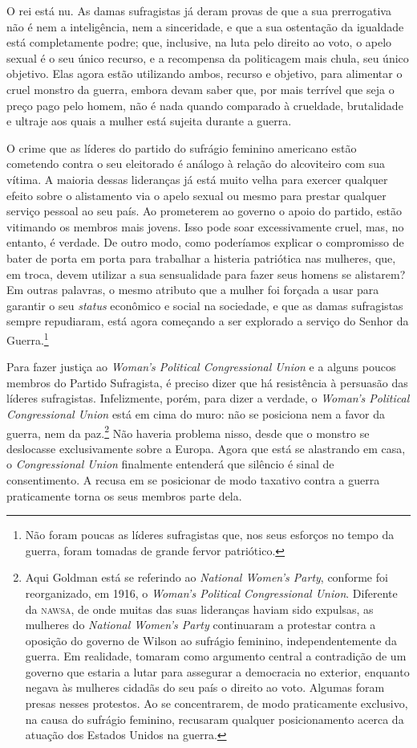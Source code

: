 O rei está nu. As damas sufragistas já deram provas de que a sua
prerrogativa não é nem a inteligência, nem a sinceridade, e que a sua
ostentação da igualdade está completamente podre; que, inclusive, na
luta pelo direito ao voto, o apelo sexual é o seu único recurso, e a
recompensa da politicagem mais chula, seu único objetivo. Elas agora
estão utilizando ambos, recurso e objetivo, para alimentar o cruel
monstro da guerra, embora devam saber que, por mais terrível que seja o
preço pago pelo homem, não é nada quando comparado à crueldade,
brutalidade e ultraje aos quais a mulher está sujeita durante a guerra.

O crime que as líderes do partido do sufrágio feminino americano estão
cometendo contra o seu eleitorado é análogo à relação do alcoviteiro com
sua vítima. A maioria dessas lideranças já está muito velha para exercer
qualquer efeito sobre o alistamento via o apelo sexual ou mesmo para
prestar qualquer serviço pessoal ao seu país. Ao prometerem ao governo o
apoio do partido, estão vitimando os membros mais jovens. Isso pode soar
excessivamente cruel, mas, no entanto, é verdade. De outro modo, como
poderíamos explicar o compromisso de bater de porta em porta para
trabalhar a histeria patriótica nas mulheres, que, em troca, devem
utilizar a sua sensualidade para fazer seus homens se alistarem? Em
outras palavras, o mesmo atributo que a mulher foi forçada a usar para
garantir o seu \textit{status} econômico e social na sociedade, e que as
damas sufragistas sempre repudiaram, está agora começando a ser
explorado a serviço do Senhor da Guerra.\footnote{Não foram poucas as
  líderes sufragistas que, nos seus esforços no tempo da guerra, foram
  tomadas de grande fervor patriótico.}

Para fazer justiça ao \textit{Woman's Political Congressional Union} e a
alguns poucos membros do Partido Sufragista, é preciso dizer que há
resistência à persuasão das líderes sufragistas. Infelizmente, porém,
para dizer a verdade, o \textit{Woman's Political Congressional Union}
está em cima do muro: não se posiciona nem a favor da guerra, nem da
paz.\footnote{Aqui Goldman está se referindo ao \textit{National Women's
  Party}, conforme foi reorganizado, em 1916, o \textit{Woman's Political
  Congressional Union}. Diferente da \textsc{nawsa}, de onde muitas das suas
  lideranças haviam sido expulsas, as mulheres do \textit{National Women's
  Party} continuaram a protestar contra a oposição do governo de Wilson
  ao sufrágio feminino, independentemente da guerra. Em realidade,
  tomaram como argumento central a contradição de um governo que estaria
  a lutar para assegurar a democracia no exterior, enquanto negava às
  mulheres cidadãs do seu país o direito ao voto. Algumas foram presas
  nesses protestos. Ao se concentrarem, de modo praticamente exclusivo,
  na causa do sufrágio feminino, recusaram qualquer posicionamento
  acerca da atuação dos Estados Unidos na guerra.} Não haveria problema
nisso, desde que o monstro se deslocasse exclusivamente sobre a
Europa. Agora que está se alastrando em casa, o \textit{Congressional
Union} finalmente entenderá que silêncio é sinal de consentimento. A recusa em se
posicionar de modo taxativo contra a guerra praticamente torna os seus
membros parte dela.

